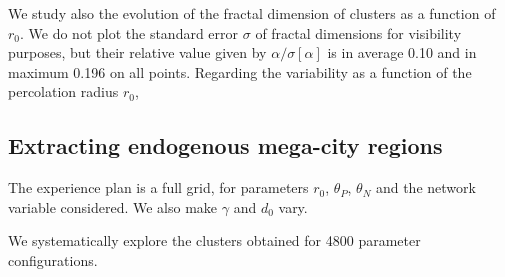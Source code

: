 \documentclass{jimis-en}
\begin{document}
We study also the evolution of the fractal dimension of clusters as a function of $r_0$.
We do not plot the standard error $\sigma$ of fractal dimensions for visibility purposes, but their relative value given by $\alpha / \sigma\left[\alpha\right]$ is in average 0.10 and in maximum 0.196 on all points. Regarding the variability as a function of the percolation radius $r_0$, 




\subsection{Extracting endogenous mega-city regions}


The experience plan is a full grid, for parameters $r_0$, $\theta_P$, $\theta_N$ and the network variable considered.
We also make $\gamma$ and $d_0$ vary.

We systematically explore the clusters obtained for 4800 parameter configurations.
\end{document}
